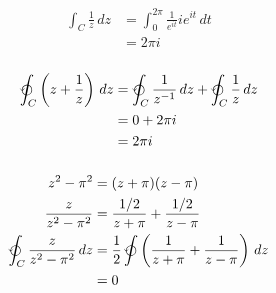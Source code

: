 \documentclass{article}
\begin{document}
\begin{align*}
  \int_C \frac{1}{z} \,d z & = \int_0^{2 \pi} \frac{1}{e^{i t}} i e^{i t} \,d t \\
                           & = 2 \pi i
\end{align*}

\setcounter{subsubsection}{10}
\subsubsection{}

\begin{align*}
  \varointctrclockwise_C \left( z + \frac{1}{z} \right) \,d z & = \varointctrclockwise_C \frac{1}{z^{-1}} \,d z + \varointctrclockwise_C \frac{1}{z} \,d z \\
                                                              & = 0 + 2 \pi i                                                                              \\
                                                              & = 2 \pi i
\end{align*}

\setcounter{subsubsection}{12}
\subsubsection{}

\begin{align*}
  z^2 - \pi^2                                        & = (z + \pi) (z - \pi)                                                                         \\
  \frac{z}{z^2 - \pi^2}                              & = \frac{1 / 2}{z + \pi} + \frac{1 / 2}{z - \pi}                                               \\
  \varointctrclockwise_C \frac{z}{z^2 - \pi^2} \,d z & = \frac{1}{2} \varointctrclockwise \left( \frac{1}{z + \pi} + \frac{1}{z - \pi} \right) \,d z \\
                                                     & = 0
\end{align*}

\setcounter{subsubsection}{14}
\subsubsection{}
\end{document}
